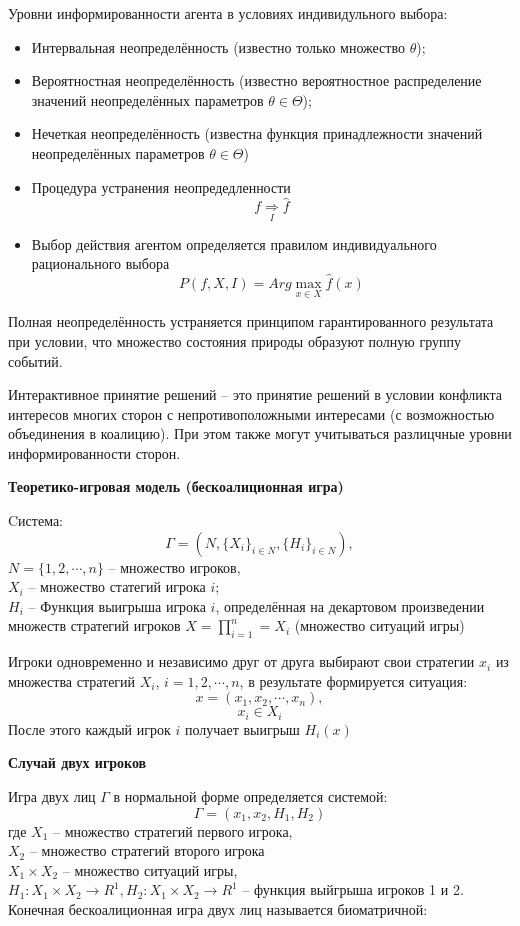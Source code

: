 \documentclass[12pt,a4paper]{article}
\begin{document}
Уровни информированности агента в условиях индивидульного выбора:
\begin{itemize}
\item Интервальная неопределённость (известно только множество $\theta$);
\item Вероятностная неопределённость (известно вероятностное распределение значений неопределённых параметров $\theta \in \Theta$);
\item Нечеткая неопределённость (известна функция принадлежности значений неопределённых параметров $\theta \in \Theta$) 
\end{itemize}
\begin{itemize}
\item Процедура устранения неопредедленности
$$f \underset{I}{\Rightarrow} \hat{f}$$
\item Выбор действия агентом определяется правилом индивидуального рационального выбора 
$$P(f,X,I) = Arg \max_{x \in X} \hat{f}(x)$$
\end{itemize}
Полная неопределённость устраняется принципом гарантированного результата при условии, что множество состояния природы образуют полную группу событий.

Интерактивное принятие решений -- это принятие решений в условии конфликта интересов многих сторон с непротивоположными интересами (с возможностью объединения в коалицию). При этом также могут учитываться разлицчные уровни информированности сторон.

\begin{center}
\textbf{Теоретико-игровая модель (бескоалиционная игра)}
\end{center}
Cистема:
$$\Gamma = (N,\{X_i\}_{i \in N}, \{H_i\}_{i \in N}),$$
$N = \{1, 2, \cdots, n\}$ -- множество игроков,\\
$X_i$ -- множество статегий игрока $i$;\\
$H_i$ -- Функция выигрыша игрока $i$, определённая на декартовом произведении множеств стратегий игроков $X =\prod_{i=1}^{n} = X_i$ (множество ситуаций игры)

Игроки одновременно и независимо друг от друга выбирают свои стратегии $x_i$ из множества стратегий $X_i$, $i = 1, 2, \cdots, n$, в результате формируется ситуация:
$$x = (x_1, x_2, \cdots, x_n),$$
$$x_i \in X_i$$
После этого каждый игрок $i$ получает выигрыш $H_i(x)$

\textbf{Случай двух игроков}

Игра двух лиц $\Gamma$ в нормальной форме определяется системой:
$$\Gamma = (x_1, x_2, H_1, H_2)$$
где $X_1$ -- множество стратегий первого игрока,\\
$X_2$ -- множество стратегий второго игрока\\
$X_1 \times X_2$ -- множество ситуаций игры,\\
$H_1: X_1 \times X_2 \rightarrow R^1, H_2: X_1 \times X_2 \rightarrow R^1$ -- функция выйгрыша игроков 1 и 2. Конечная бескоалиционная игра двух лиц называется биоматричной:
\end{document}
